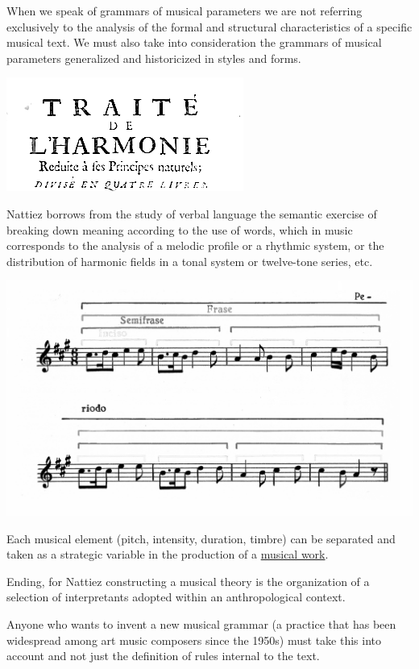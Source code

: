 When we speak of grammars of musical parameters we are not referring exclusively to the analysis of the formal and structural characteristics of a specific musical text. We must also take into consideration the grammars of musical parameters generalized and historicized in styles and forms.

\begin{center}
\includegraphics[scale=1]{../img/trattato.png}
\end{center}

Nattiez borrows from the study of verbal language the semantic exercise of breaking down meaning according to the use of words, which in music corresponds to the analysis of a melodic profile or a rhythmic system, or the distribution of harmonic fields in a tonal system or twelve-tone series, etc.

\begin{center}
\includegraphics[scale=0.8]{../img/frasemus.png}
\end{center}

Each musical element (pitch, intensity, duration, timbre) can be separated and taken as a strategic variable in the production of a \href{quinta.mp4}{musical work}.

Ending, for Nattiez constructing a musical theory is the organization of a selection of interpretants adopted within an anthropological context.

Anyone who wants to invent a new musical grammar (a practice that has been widespread among art music composers since the 1950s) must take this into account and not just the definition of rules internal to the text.

